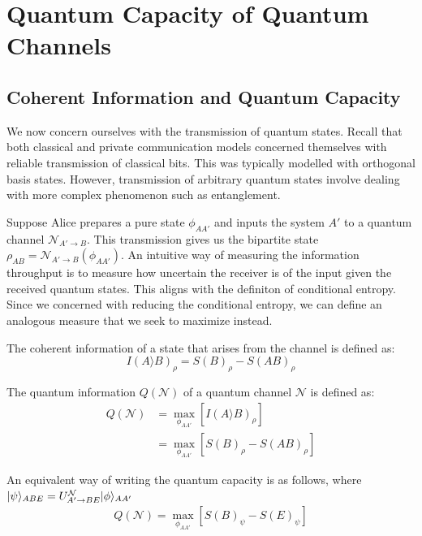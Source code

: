 \section{Quantum Capacity of Quantum Channels}

\subsection{Coherent Information and Quantum Capacity}

We now concern ourselves with the transmission of quantum states. Recall that both classical and private communication models concerned themselves with reliable transmission of classical bits. This was typically modelled with orthogonal basis states. However, transmission of arbitrary quantum states involve dealing with more complex phenomenon such as entanglement.

Suppose Alice prepares a pure state $\phi_{AA'}$ and inputs the system $A'$ to a quantum channel $\mathcal{N}_{A' \rightarrow B}$. This transmission gives us the bipartite state $\rho_{AB} = \mathcal{N}_{A' \rightarrow B} (\phi_{AA'})$. An intuitive way of measuring the information throughput is to measure how uncertain the receiver is of the input given the received quantum states. This aligns with the definiton of conditional entropy. Since we concerned with reducing the conditional entropy, we can define an analogous measure that we seek to maximize instead.

\begin{definition}
The coherent information of a state that arises from the channel is defined as:
$$I(A \rangle B)_{\rho} = S(B)_{\rho} - S(AB)_{\rho}$$
\end{definition}

\begin{definition}
The quantum information $Q(\mathcal{N})$ of a quantum channel $\mathcal{N}$ is defined as:
\begin{align*}
Q(\mathcal{N}) &= \max_{\phi_{AA'}} \left[ I(A \rangle B)_{\rho} \right] \\
&= \max_{\phi_{AA'}} \left[ S(B)_\rho - S(AB)_\rho \right]
\end{align*}
\end{definition}

An equivalent way of writing the quantum capacity is as follows, where $\lvert\psi\rangle_{ABE} = U_{A' \rightarrow BE}^{\mathcal{N}} \lvert\phi\rangle_{AA'}$
\begin{align*}
Q(\mathcal{N}) = \max_{\phi_{AA'}} \left[ S(B)_\psi - S(E)_\psi \right]
\end{align*}

